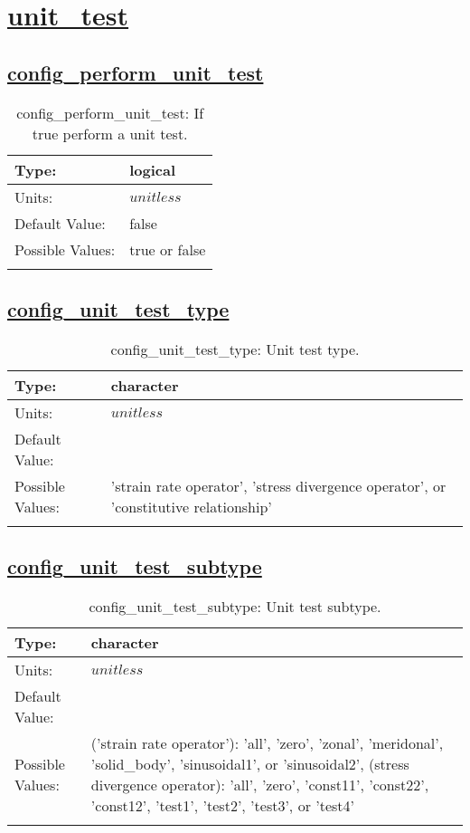 \section[unit\_test]{\hyperref[sec:nm_tab_unit_test]{unit\_test}}
\label{sec:nm_sec_unit_test}
\subsection[config\_perform\_unit\_test]{\hyperref[sec:nm_tab_unit_test]{config\_perform\_unit\_test}}
\label{subsec:nm_sec_config_perform_unit_test}
\begin{center}
\begin{longtable}{| p{2.0in} || p{4.0in} |}
    \hline
    Type: & logical \\
    \hline
    Units: & $unitless$ \\
    \hline
    Default Value: & false \\
    \hline
    Possible Values: & true or false \\
    \hline
    \caption{config\_perform\_unit\_test: If true perform a unit test.}
\end{longtable}
\end{center}
\subsection[config\_unit\_test\_type]{\hyperref[sec:nm_tab_unit_test]{config\_unit\_test\_type}}
\label{subsec:nm_sec_config_unit_test_type}
\begin{center}
\begin{longtable}{| p{2.0in} || p{4.0in} |}
    \hline
    Type: & character \\
    \hline
    Units: & $unitless$ \\
    \hline
    Default Value: &  \\
    \hline
    Possible Values: & 'strain rate operator', 'stress divergence operator', or 'constitutive relationship' \\
    \hline
    \caption{config\_unit\_test\_type: Unit test type.}
\end{longtable}
\end{center}
\subsection[config\_unit\_test\_subtype]{\hyperref[sec:nm_tab_unit_test]{config\_unit\_test\_subtype}}
\label{subsec:nm_sec_config_unit_test_subtype}
\begin{center}
\begin{longtable}{| p{2.0in} || p{4.0in} |}
    \hline
    Type: & character \\
    \hline
    Units: & $unitless$ \\
    \hline
    Default Value: &  \\
    \hline
    Possible Values: & ('strain rate operator'): 'all', 'zero', 'zonal', 'meridonal', 'solid\_body', 'sinusoidal1', or 'sinusoidal2', (stress divergence operator): 'all', 'zero', 'const11', 'const22', 'const12', 'test1', 'test2', 'test3', or 'test4' \\
    \hline
    \caption{config\_unit\_test\_subtype: Unit test subtype.}
\end{longtable}
\end{center}
